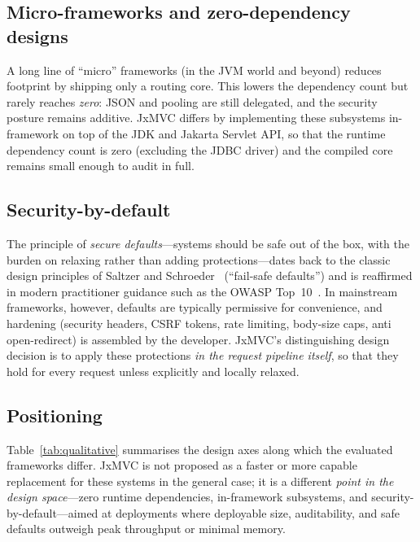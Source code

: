 \subsection{Micro-frameworks and zero-dependency designs}

A long line of ``micro'' frameworks (in the JVM world and beyond)
reduces footprint by shipping only a routing core. This lowers the
dependency count but rarely reaches \emph{zero}: JSON and pooling are
still delegated, and the security posture remains additive. JxMVC
differs by implementing these subsystems in-framework on top of the JDK
and Jakarta Servlet API, so that the runtime dependency count is zero
(excluding the JDBC driver) and the compiled core remains small enough
to audit in full.

\subsection{Security-by-default}

The principle of \emph{secure defaults}---systems should be safe out of
the box, with the burden on relaxing rather than adding
protections---dates back to the classic design principles of Saltzer
and Schroeder~\cite{saltzer1975} (``fail-safe defaults'') and is
reaffirmed in modern practitioner guidance such as the OWASP
Top~10~\cite{owasp}. In
mainstream frameworks, however, defaults are typically permissive for
convenience, and hardening (security headers, CSRF tokens, rate
limiting, body-size caps, anti open-redirect) is assembled by the
developer. JxMVC's distinguishing design decision is to apply these
protections \emph{in the request pipeline itself}, so that they hold
for every request unless explicitly and locally relaxed.

\subsection{Positioning}

Table~\ref{tab:qualitative} summarises the design axes along which the
evaluated frameworks differ. JxMVC is not proposed as a faster or more
capable replacement for these systems in the general case; it is a
different \emph{point in the design space}---zero runtime dependencies,
in-framework subsystems, and security-by-default---aimed at deployments
where deployable size, auditability, and safe defaults outweigh peak
throughput or minimal memory.


